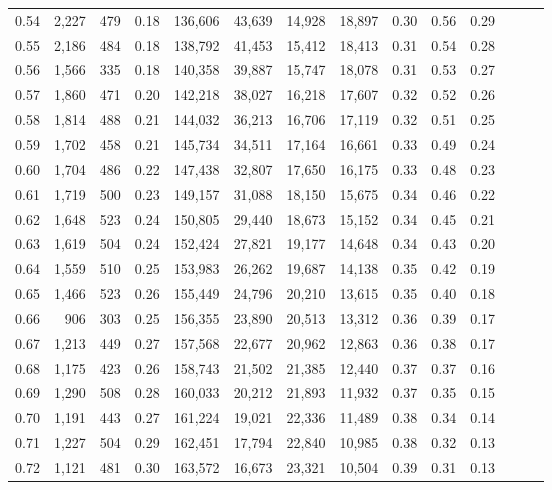 \begin{tabular}{rrrrrrrrrrrrrr}
0.54 &  2,227 &  479 &  0.18 &  136,606 &   43,639 &  14,928 &  18,897 &  0.30 &  0.56 &      0.29 \\
0.55 &  2,186 &  484 &  0.18 &  138,792 &   41,453 &  15,412 &  18,413 &  0.31 &  0.54 &      0.28 \\
0.56 &  1,566 &  335 &  0.18 &  140,358 &   39,887 &  15,747 &  18,078 &  0.31 &  0.53 &      0.27 \\
0.57 &  1,860 &  471 &  0.20 &  142,218 &   38,027 &  16,218 &  17,607 &  0.32 &  0.52 &      0.26 \\
0.58 &  1,814 &  488 &  0.21 &  144,032 &   36,213 &  16,706 &  17,119 &  0.32 &  0.51 &      0.25 \\
0.59 &  1,702 &  458 &  0.21 &  145,734 &   34,511 &  17,164 &  16,661 &  0.33 &  0.49 &      0.24 \\
0.60 &  1,704 &  486 &  0.22 &  147,438 &   32,807 &  17,650 &  16,175 &  0.33 &  0.48 &      0.23 \\
0.61 &  1,719 &  500 &  0.23 &  149,157 &   31,088 &  18,150 &  15,675 &  0.34 &  0.46 &      0.22 \\
0.62 &  1,648 &  523 &  0.24 &  150,805 &   29,440 &  18,673 &  15,152 &  0.34 &  0.45 &      0.21 \\
0.63 &  1,619 &  504 &  0.24 &  152,424 &   27,821 &  19,177 &  14,648 &  0.34 &  0.43 &      0.20 \\
0.64 &  1,559 &  510 &  0.25 &  153,983 &   26,262 &  19,687 &  14,138 &  0.35 &  0.42 &      0.19 \\
0.65 &  1,466 &  523 &  0.26 &  155,449 &   24,796 &  20,210 &  13,615 &  0.35 &  0.40 &      0.18 \\
0.66 &    906 &  303 &  0.25 &  156,355 &   23,890 &  20,513 &  13,312 &  0.36 &  0.39 &      0.17 \\
0.67 &  1,213 &  449 &  0.27 &  157,568 &   22,677 &  20,962 &  12,863 &  0.36 &  0.38 &      0.17 \\
0.68 &  1,175 &  423 &  0.26 &  158,743 &   21,502 &  21,385 &  12,440 &  0.37 &  0.37 &      0.16 \\
0.69 &  1,290 &  508 &  0.28 &  160,033 &   20,212 &  21,893 &  11,932 &  0.37 &  0.35 &      0.15 \\
0.70 &  1,191 &  443 &  0.27 &  161,224 &   19,021 &  22,336 &  11,489 &  0.38 &  0.34 &      0.14 \\
0.71 &  1,227 &  504 &  0.29 &  162,451 &   17,794 &  22,840 &  10,985 &  0.38 &  0.32 &      0.13 \\
0.72 &  1,121 &  481 &  0.30 &  163,572 &   16,673 &  23,321 &  10,504 &  0.39 &  0.31 &      0.13 \\

\end{tabular}
